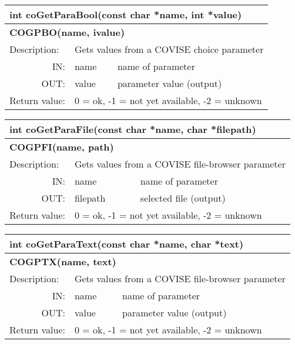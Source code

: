 \begin{htmlonly}
\begin{longtable}{|p{4cm}|p{2.5cm}|p{7cm}|}
\hline
\multicolumn{3}{|p{13.5cm}|}{\bf int coGetParaBool(const char *name, int *value)}  \\
\hline
\multicolumn{3}{|p{13.5cm}|}{\bf COGPBO(name, ivalue)} \\
\hline
\hline
{Description:}  
           & \multicolumn{2}{|p{9.5cm}|}{Gets values from a COVISE choice parameter} \\
\hline
\multicolumn{1}{|r|}{IN:} & {name} 
                          & {name of parameter}\\
\hline
\multicolumn{1}{|r|}{OUT:} & {value} 
                           & {parameter value (output)}\\
\hline
{Return value:}  
  & \multicolumn{2}{|p{9.5cm}|}{0 = ok, -1 = not yet available, -2 = unknown} \endhead
\hline
\end{longtable}

\begin{longtable}{|p{4cm}|p{2.5cm}|p{7cm}|}
\hline
\multicolumn{3}{|p{13.5cm}|}{\bf int coGetParaFile(const char *name, char *filepath)}  \\
\hline
\multicolumn{3}{|p{13.5cm}|}{\bf COGPFI(name, path)} \\
\hline
\hline
{Description:}  
           & \multicolumn{2}{|p{9.5cm}|}{Gets values from a COVISE file-browser parameter} \\
\hline
\multicolumn{1}{|r|}{IN:} & {name} 
                          & {name of parameter}\\
\hline
\multicolumn{1}{|r|}{OUT:} & {filepath} 
                           & {selected file (output)}\\
\hline
{Return value:}  
  & \multicolumn{2}{|p{9.5cm}|}{0 = ok, -1 = not yet available, -2 = unknown} \endhead
\hline
\end{longtable}

\begin{longtable}{|p{4cm}|p{2.5cm}|p{7cm}|}
\hline
\multicolumn{3}{|p{13.5cm}|}{\bf int coGetParaText(const char *name, char *text)}  \\
\hline
\multicolumn{3}{|p{13.5cm}|}{\bf COGPTX(name, text)}  \\
\hline
\hline
{Description:}  
           & \multicolumn{2}{|p{9.5cm}|}{Gets values from a COVISE file-browser parameter} \\
\hline
\multicolumn{1}{|r|}{IN:} & {name} 
                          & {name of parameter}\\
\hline
\multicolumn{1}{|r|}{OUT:} & {value} 
                           & {parameter value (output)}\\
\hline
{Return value:}  
  & \multicolumn{2}{|p{9.5cm}|}{0 = ok, -1 = not yet available, -2 = unknown} \endhead
\hline
\end{longtable}


\end{htmlonly}
